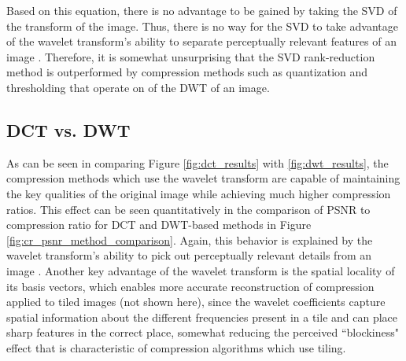 \documentclass[conference]{IEEEtran}
\begin{document}
Based on this equation, there is no advantage to be gained by taking the SVD of the transform of the image.
Thus, there is no way for the SVD to take advantage of the wavelet transform's ability to separate perceptually relevant features of an image \cite{hvsWavelet}.
Therefore, it is somewhat unsurprising that the SVD rank-reduction method is outperformed by compression methods such as quantization and thresholding that operate on of the DWT of an image.

\subsection{DCT vs. DWT}
As can be seen in comparing Figure \ref{fig:dct_results} with \ref{fig:dwt_results}, the compression methods which use the wavelet transform are capable of maintaining the key qualities of the original image while achieving much higher compression ratios.
This effect can be seen quantitatively in the comparison of PSNR to compression ratio for DCT and DWT-based methods in Figure \ref{fig:cr_psnr_method_comparison}.
Again, this behavior is explained by the wavelet transform's ability to pick out perceptually relevant details from an image \cite{hvsWavelet}.
Another key advantage of the wavelet transform is the spatial locality of its basis vectors,
which enables more accurate reconstruction of compression applied to tiled images (not shown here),
since the wavelet coefficients capture spatial information about the different frequencies present in a tile and can place sharp features in the correct place,
somewhat reducing the perceived ``blockiness" effect that is characteristic of compression algorithms which use tiling.
\end{document}

